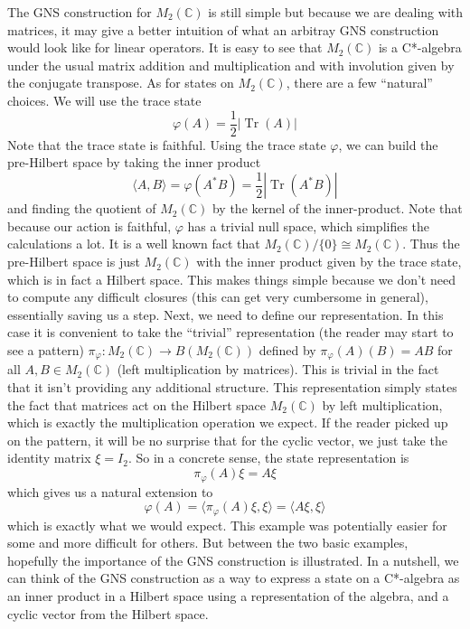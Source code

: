 \begin{example}
The GNS construction for \( M_2(\mathbb{C}) \) is still simple but because we are
dealing with matrices, it may give a better intuition of what an arbitray GNS construction
would look like for linear operators. It is easy to see that $M_2(\mathbb{C})$ is a
C*-algebra under the usual matrix addition and multiplication and with involution
given by the conjugate transpose. As for states on $M_2(\mathbb{C})$, there are
a few ``natural'' choices. We will use the trace state
\begin{equation}
    \varphi(A) = \frac{1}{2} | \operatorname{Tr}(A) |
\end{equation}
Note that the trace state is faithful. Using the trace state $\varphi$, we can
build the pre-Hilbert space by taking the inner product
\begin{equation}
    \langle A,B \rangle = \varphi(A^*B) = \frac{1}{2} | \operatorname{Tr}(A^*B) |
\end{equation}
and finding the quotient of $M_2(\mathbb{C})$ by the kernel of the inner-product.
Note that because our action is faithful, $\varphi$ has a trivial null space, which
simplifies the calculations a lot. It is a well known fact that $M_2(\mathbb{C})/\{0\} \cong M_2(\mathbb{C})$.
Thus the pre-Hilbert space is just $M_2(\mathbb{C})$ with the inner product given
by the trace state, which is in fact a Hilbert space. This makes things simple because
we don't need to compute any difficult closures (this can get very cumbersome in general),
essentially saving us a step. Next, we need to define our representation. In this case
it is convenient to take the ``trivial'' representation (the reader may start to see a pattern)
$\pi_\varphi: M_2(\mathbb{C}) \to B(M_2(\mathbb{C}))$
defined by $\pi_\varphi(A)(B) = AB$ for all $A,B \in M_2(\mathbb{C})$
(left multiplication by matrices). This is trivial in the fact that it isn't providing
any additional structure. This representation simply states the fact that matrices act on the Hilbert space
$M_2(\mathbb{C})$ by left multiplication, which is exactly the multiplication operation
we expect. If the reader picked up on the pattern, it will be no surprise that for the
cyclic vector, we just take the identity matrix $\xi = I_2$. So in a concrete sense,
the state representation is
\begin{equation}
    \pi_\varphi (A) \xi = A \xi
\end{equation}
which gives us a natural extension to
\begin{equation}
    \varphi(A) = \langle \pi_\varphi(A )\xi, \xi \rangle = \langle A\xi , \xi \rangle
\end{equation}
which is exactly what we would expect. This example was potentially easier for some
and more difficult for others. But between the two basic examples, hopefully the 
importance of the GNS construction is illustrated. In a nutshell, we can think of 
the GNS construction as a way to express a state on a C*-algebra as an inner
product in a Hilbert space using a representation of the algebra, and a cyclic
vector from the Hilbert space.


\end{example}
